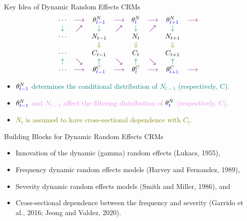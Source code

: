 \documentclass[ignorenonframetext,]{beamer}
\begin{document}
\begin{frame}{Key Idea of Dynamic Random Effects CRMs}
$$
\begin{array}{cccccccc}
\cdots & \textcolor{violet}{\longrightarrow} & \theta^N_{\textcolor{blue}{t-1}} & \textcolor{violet}{\longrightarrow} & \theta^N_{\textcolor{blue}{t}} & \textcolor{violet}{\longrightarrow} & \theta^N_{\textcolor{blue}{t+1}} & \textcolor{violet}{\longrightarrow} \\
\textcolor{teal}{\downarrow} & \textcolor{violet}{\nearrow} & \textcolor{teal}{\downarrow} & \textcolor{violet}{\nearrow} & \textcolor{teal}{\downarrow} & \textcolor{violet}{\nearrow} & \textcolor{teal}{\downarrow} & \\
\cdots & & N_{t-1} & & N_t & & N_{t+1} & \\
 & & \textcolor{olive}{\Downarrow} & & \textcolor{olive}{\Downarrow} & & \textcolor{olive}{\Downarrow} & \\
\cdots & & C_{t-1} & & C_t & & C_{t+1} & \\
\textcolor{teal}{\uparrow} & \textcolor{violet}{\searrow} & \textcolor{teal}{\uparrow} & \textcolor{violet}{\searrow} & \textcolor{teal}{\uparrow} & \textcolor{violet}{\searrow} & \textcolor{teal}{\uparrow} & \\
\cdots & \textcolor{violet}{\longrightarrow} & \theta^C_{\textcolor{blue}{t-1}} & \textcolor{violet}{\longrightarrow} & \theta^C_{\textcolor{blue}{t}} & \textcolor{violet}{\longrightarrow} & \theta^C_{\textcolor{blue}{t+1}} & \textcolor{violet}{\longrightarrow}
\end{array}
$$
\pause
\begin{itemize}
\item \textcolor{teal}{$\theta^N_{\textcolor{blue}{t-1}}$ determines the conditional distribution of $N_{t-1}$ (respectively, C).}
\pause
\item \textcolor{violet}{$\theta^N_{\textcolor{blue}{t-1}}$ and $N_{t-1}$ affect the filtering distribution of $\theta^N_{\textcolor{blue}{t}}$ (respectively, C).}
\pause
\item \textcolor{olive}{$N_t$ is assumed to have cross-sectional dependence with $C_t$.}
\end{itemize}
\end{frame}

\begin{frame}{Building Blocks for Dynamic Random Effects CRMs}
\begin{itemize}
\item<2-> Innovation of the dynamic (gamma) random effects (Lukacs, 1955),
\item<3-> Frequency dynamic random effects models (Harvey and Fernandez, 1989),
\item<4-> Severity dynamic random effects models (Smith and Miller, 1986), and
\item<5-> Cross-sectional dependence between the frequency and severity (Garrido et al., 2016; Jeong and Valdez, 2020).
\end{itemize}
\end{frame}
\end{document}
